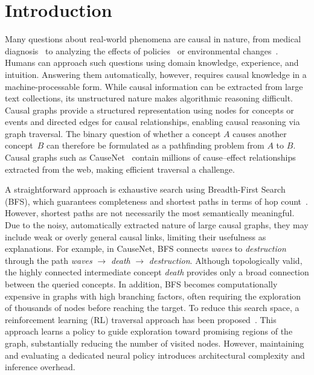 \chapter{Introduction}

Many questions about real-world phenomena are causal in nature, from medical diagnosis~\cite{richens:2020} to analyzing the effects of policies~\cite{blackwell:2013} or environmental changes~\cite{guevara:2025}. Humans can approach such questions using domain knowledge, experience, and intuition. Answering them automatically, however, requires causal knowledge in a machine-processable form. While causal information can be extracted from large text collections, its unstructured nature makes algorithmic reasoning difficult. Causal graphs provide a structured representation using nodes for concepts or events and directed edges for causal relationships, enabling causal reasoning via graph traversal. The binary question of whether a concept $A$ causes another concept~$B$ can therefore be formulated as a pathfinding problem from $A$ to $B$. Causal graphs such as CauseNet~\cite{heindorf:2020} contain millions of cause--effect relationships extracted from the web, making efficient traversal a challenge.

A straightforward approach is exhaustive search using Breadth-First Search (BFS), which guarantees completeness and shortest paths in terms of hop count~\cite{cormen:2022}. However, shortest paths are not necessarily the most semantically meaningful. Due to the noisy, automatically extracted nature of large causal graphs, they may include weak or overly general causal links, limiting their usefulness as explanations. For example, in CauseNet, BFS connects \textit{waves} to \textit{destruction} through the path \textit{waves} $\rightarrow$ \textit{death} $\rightarrow$ \textit{destruction}. Although topologically valid, the highly connected intermediate concept \textit{death} provides only a broad connection between the queried concepts. In addition, BFS becomes computationally expensive in graphs with high branching factors, often requiring the exploration of thousands of nodes before reaching the target. To reduce this search space, a reinforcement learning (RL) traversal approach has been proposed~\cite{bluebaum:2024}. This approach learns a policy to guide exploration toward promising regions of the graph, substantially reducing the number of visited nodes. However, maintaining and evaluating a dedicated neural policy introduces architectural complexity and inference overhead.

